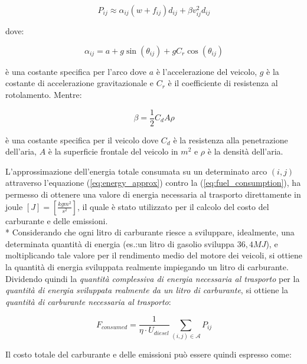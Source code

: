 	\begin{equation}
		\label{eq:energy_approx}
		P_{ij} \approx \alpha_{ij}(w + f_{ij})d_{ij} + \beta v_{ij}^2 d_{ij}
	\end{equation}

	dove:

	\begin{equation}
		\label{eq:slope_param}
		\alpha_{ij} = a + g\sin(\theta_{ij}) + gC_r \cos(\theta_{ij})
	\end{equation}

	è una costante specifica per l’arco dove $a$ è l’accelerazione del veicolo, $g$ è la costante di accelerazione gravitazionale e $C_{r}$ è il coefficiente di resistenza al rotolamento. Mentre:

	\begin{equation}
		\label{eq:vehicle_param}
		\beta = \frac{1}{2}C_d A \rho
	\end{equation}

	è una costante specifica per il veicolo dove $C_{d}$ è la resistenza alla penetrazione dell’aria, $A$ è la superficie frontale del veicolo in $m^2$ e $\rho$ è la densità dell’aria.

	L’approssimazione dell’energia totale consumata su un determinato arco $(i,j)$ attraverso l’equazione (\ref{eq:energy_approx}) contro la (\ref{eq:fuel_consumption}), ha permesso di ottenere una valore di energia necessaria al trasporto direttamente in joule $[J] = \left[ \frac{kg m^2}{s^2} \right]$, il quale è stato utilizzato per il calcolo del costo del carburante e delle emissioni. \\*
	Considerando che ogni litro di carburante riesce a sviluppare, idealmente, una determinata quantità di energia (es.:un litro di gasolio sviluppa $36,4 MJ$), e moltiplicando tale valore per il rendimento medio del motore dei veicoli, si ottiene la quantità di energia sviluppata realmente impiegando un litro di carburante. Dividendo quindi la \emph{quantità complessiva di energia necessaria al trasporto} per la \emph{quantità di energia sviluppata realmente da un litro di carburante}, si ottiene la \emph{quantità di carburante necessaria al trasporto}:

	\begin{equation}
		\label{eq:fuel_consumed}
		F_{consumed} = \frac{1}{\eta \cdot U_{diesel}} \sum_{(i,j) \in \mathcal{A}} P_{ij} 
	\end{equation}

	Il costo totale del carburante e delle emissioni può essere quindi espresso come:


